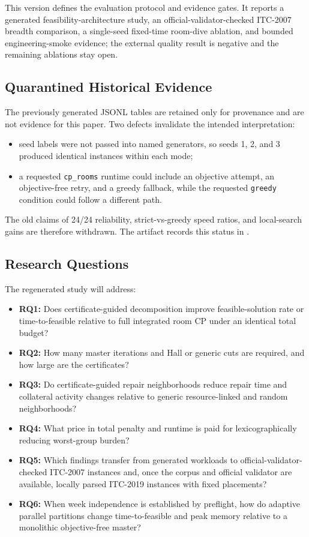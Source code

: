 This version defines the evaluation protocol and evidence gates.
It reports a generated feasibility-architecture study, an official-validator-checked ITC-2007 breadth comparison, a single-seed fixed-time room-dive ablation, and bounded engineering-smoke evidence; the external quality result is negative and the remaining ablations stay open.

\subsection{Quarantined Historical Evidence}
The previously generated JSONL tables are retained only for provenance and are not evidence for this paper.
Two defects invalidate the intended interpretation:
\begin{itemize}[leftmargin=*]
  \item seed labels were not passed into named generators, so seeds 1, 2, and 3 produced identical instances within each mode;
  \item a requested \texttt{cp\_rooms} runtime could include an objective attempt, an objective-free retry, and a greedy fallback, while the requested \texttt{greedy} condition could follow a different path.
\end{itemize}
The old claims of 24/24 reliability, strict-vs-greedy speed ratios, and local-search gains are therefore withdrawn.
The artifact records this status in .

\subsection{Research Questions}
The regenerated study will address:
\begin{itemize}[leftmargin=*]
  \item \textbf{RQ1:} Does certificate-guided decomposition improve feasible-solution rate or time-to-feasible relative to full integrated room CP under an identical total budget?
  \item \textbf{RQ2:} How many master iterations and Hall or generic cuts are required, and how large are the certificates?
  \item \textbf{RQ3:} Do certificate-guided repair neighborhoods reduce repair time and collateral activity changes relative to generic resource-linked and random neighborhoods?
  \item \textbf{RQ4:} What price in total penalty and runtime is paid for lexicographically reducing worst-group burden?
  \item \textbf{RQ5:} Which findings transfer from generated workloads to official-validator-checked ITC-2007 instances and, once the corpus and official validator are available, locally parsed ITC-2019 instances with fixed placements?
  \item \textbf{RQ6:} When week independence is established by preflight, how do adaptive parallel partitions change time-to-feasible and peak memory relative to a monolithic objective-free master?
\end{itemize}

